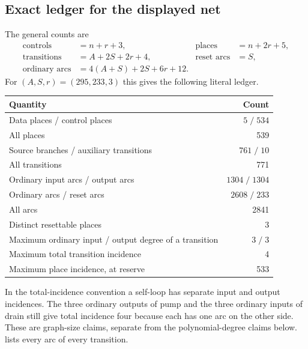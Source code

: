 \documentclass[11pt,letterpaper]{article}
\theoremstyle{definition}
\theoremstyle{remark}
\begin{document}
\subsection{Exact ledger for the displayed net}
The general counts are
\begin{align*}
 \text{controls}&=n+r+3,&\text{places}&=n+2r+5,\\
 \text{transitions}&=A+2S+2r+4,&\text{reset arcs}&=S,\\
 \text{ordinary arcs}&=4(A+S)+2S+6r+12.
\end{align*}
For $(A,S,r)=(295,233,3)$ this gives the following literal ledger.
\begin{center}
\begin{tabular}{lr}
\toprule
Quantity & Count\\\midrule
Data places / control places & $5\;/\;534$\\
All places & 539\\
Source branches / auxiliary transitions & $761\;/\;10$\\
All transitions & 771\\
Ordinary input arcs / output arcs & $1304\;/\;1304$\\
Ordinary arcs / reset arcs & $2608\;/\;233$\\
All arcs & 2841\\
Distinct resettable places & 3\\
Maximum ordinary input / output degree of a transition & $3\;/\;3$\\
Maximum total transition incidence & 4\\
Maximum place incidence, at reserve & 533\\
\bottomrule
\end{tabular}
\end{center}
In the total-incidence convention a self-loop has separate input and output incidences. The three ordinary outputs of pump and the three ordinary inputs of drain still give total incidence four because each has one arc on the other side. These are graph-size claims, separate from the polynomial-degree claims below.  lists every arc of every transition.
\end{document}
